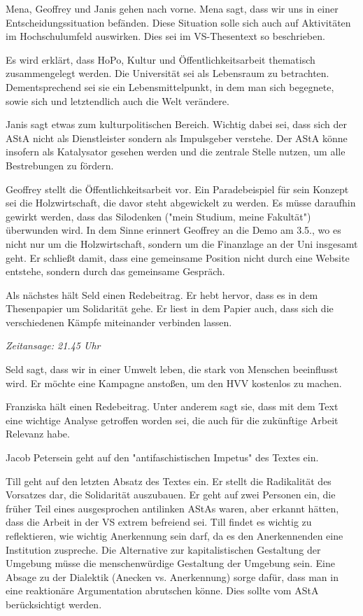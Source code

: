 \documentclass[ngerman,headheight=70pt]{scrartcl}
\begin{document}
    Mena, Geoffrey und Janis gehen nach vorne. Mena sagt, dass wir uns in einer
    Entscheidungssituation befänden. Diese Situation solle sich auch auf Aktivitäten
    im Hochschulumfeld auswirken. Dies sei im VS-Thesentext so beschrieben.

    Es wird erklärt, dass HoPo, Kultur und Öffentlichkeitsarbeit thematisch
    zusammengelegt werden. Die Universität sei als Lebensraum zu betrachten.
    Dementsprechend sei sie ein Lebensmittelpunkt, in dem man sich begegnete,
    sowie sich und letztendlich auch die Welt verändere.

    Janis sagt etwas zum kulturpolitischen Bereich. Wichtig dabei sei, dass sich
    der AStA nicht als Dienstleister sondern als Impulsgeber verstehe.
    Der AStA könne insofern als Katalysator gesehen werden und die zentrale
    Stelle nutzen, um alle Bestrebungen zu fördern.

    Geoffrey stellt die Öffentlichkeitsarbeit vor. Ein Paradebeispiel für sein
    Konzept sei die Holzwirtschaft, die davor steht abgewickelt zu werden. Es
    müsse daraufhin gewirkt werden, dass das Silodenken ("mein Studium, meine Fakultät")
    überwunden wird. In dem Sinne erinnert Geoffrey an die Demo am 3.5., wo es
    nicht nur um die Holzwirtschaft, sondern um die Finanzlage an der Uni insgesamt
    geht. Er schließt damit, dass eine gemeinsame Position nicht durch eine
    Website entstehe, sondern durch das gemeinsame Gespräch.

    Als nächstes hält Seld einen Redebeitrag. Er hebt hervor, dass es in dem
    Thesenpapier um Solidarität gehe. Er liest in dem Papier auch, dass sich die
    verschiedenen Kämpfe miteinander verbinden lassen.

    \textit{Zeitansage: 21.45 Uhr}

    Seld sagt, dass wir in einer Umwelt leben, die stark von Menschen beeinflusst
    wird. Er möchte eine Kampagne anstoßen, um den HVV kostenlos zu machen.

    Franziska hält einen Redebeitrag. Unter anderem sagt sie, dass mit dem Text
    eine wichtige Analyse getroffen worden sei, die auch für die zukünftige
    Arbeit Relevanz habe.

    Jacob Petersein geht auf den "antifaschistischen Impetus" des Textes
    ein.

    Till geht auf den letzten Absatz des Textes ein. Er stellt die Radikalität
    des Vorsatzes dar, die Solidarität auszubauen. Er geht auf zwei Personen
    ein, die früher Teil eines ausgesprochen antilinken AStAs waren, aber erkannt
    hätten, dass die Arbeit in der VS extrem befreiend sei. Till findet es wichtig
    zu reflektieren, wie wichtig Anerkennung sein darf, da es den Anerkennenden
    eine Institution zuspreche. Die Alternative zur kapitalistischen Gestaltung
    der Umgebung müsse die menschenwürdige Gestaltung der Umgebung sein. Eine
    Absage zu der Dialektik (Anecken vs. Anerkennung) sorge dafür, dass
    man in eine reaktionäre Argumentation abrutschen könne. Dies sollte vom
    AStA berücksichtigt werden.
\end{document}
